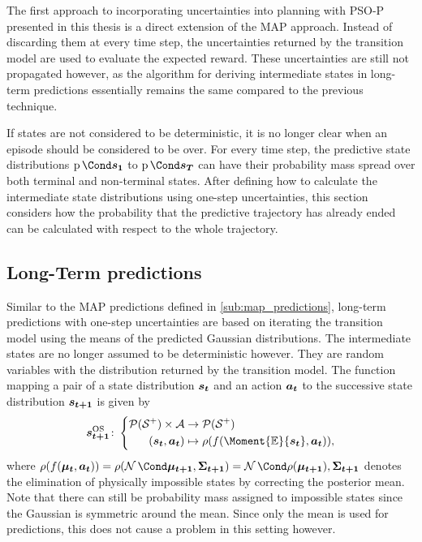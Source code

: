 The first approach to incorporating uncertainties into planning with PSO-P presented in this thesis is a direct extension of the MAP approach.
Instead of discarding them at every time step, the uncertainties returned by the transition model are used to evaluate the expected reward.
These uncertainties are still not propagated however, as the algorithm for deriving intermediate states in long-term predictions essentially remains the same compared to the previous technique.

If states are not considered to be deterministic, it is no longer clear when an episode should be considered to be over.
For every time step, the predictive state distributions $\Prob{\mat{s_1}}$ to $\Prob{\mat{s_T}}$ can have their probability mass spread over both terminal and non-terminal states.
After defining how to calculate the intermediate state distributions using one-step uncertainties, this section considers how the probability that the predictive trajectory has already ended can be calculated with respect to the whole trajectory.

\subsection{Long-Term predictions}
\label{sub:os_predictions}
Similar to the MAP predictions defined in \cref{sub:map_predictions}, long-term predictions with one-step uncertainties are based on iterating the transition model using the means of the predicted Gaussian distributions.
The intermediate states are no longer assumed to be deterministic however.
They are random variables with the distribution returned by the transition model.
The function mapping a pair of a state distribution $\bm{s_t}$ and an action $\bm{a_t}$ to the successive state distribution $\bm{s_{t+1}}$ is given by
\begin{align}
    \label{eq:os_dynamic_programming}
    \os{\mat{s_{t+1}}} \colon \left\{
        \begin{aligned}
            \Dists(\Es^+) \times \Ah &\to \Dists(\Es^+) \\
            (\rv{s_t}, \mat{a_t}) &\mapsto \squeeze(f(\Moment{\E}{\rv{s_t}}, \mat{a_t})),
    \end{aligned}
    \right.
\end{align}
where $\squeeze(f(\mat{\mu_t}, \mat{a_t})) = \squeeze(\Gaussian{\mat{\mu_{t+1}}, \mat{\Sigma_{t+1}}}) = \Gaussian{\squeeze(\mat{\mu_{t+1}}), \mat{\Sigma_{t+1}}}$ denotes the elimination of physically impossible states by correcting the posterior mean.
Note that there can still be probability mass assigned to impossible states since the Gaussian is symmetric around the mean.
Since only the mean is used for predictions, this does not cause a problem in this setting however.

